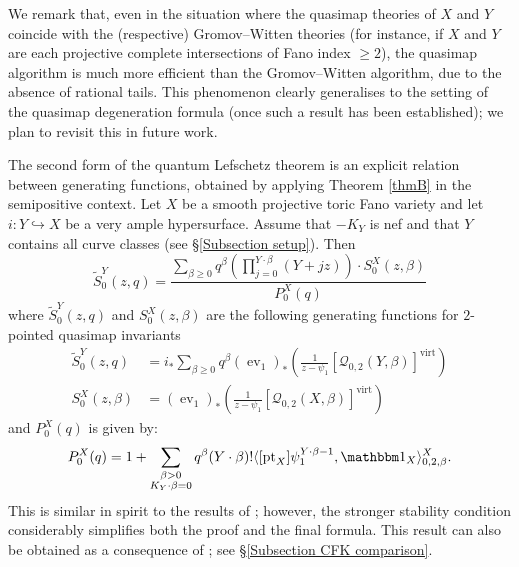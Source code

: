\documentclass[10pt]{amsart}
\newcommand{\Q}[4]{\mathcal{Q}_{#1,#2}(#3,#4)}
\newcommand{\virt}[1]{[#1]^{\operatorname{virt}}}
\newcommand{\pt}{\operatorname{pt}}
\newcommand{\ev}{\operatorname{ev}}
\theoremstyle{definition}
\newenvironment{customthm}[1]
  {\renewcommand\theinnercustomthm{#1}\innercustomthm}
  {\endinnercustomthm}
\theoremstyle{definition}
\begin{document}
We remark that, even in the situation where the quasimap theories of $X$ and $Y$ coincide with the (respective) Gromov--Witten theories (for instance, if $X$ and $Y$ are each projective complete intersections of Fano index $\geq 2$), the quasimap algorithm is much more efficient than the Gromov--Witten algorithm, due to the absence of rational tails. This phenomenon clearly generalises to the setting of the quasimap degeneration formula (once such a result has been established); we plan to revisit this in future work.

The second form of the quantum Lefschetz theorem is an explicit relation between generating functions, obtained by applying Theorem \ref{thmB} in the semipositive context.
\begin{customthm}{C}[\textbf{Theorem \ref{Theorem Quantum Lefschetz}}]\label{thmC}
Let $X$ be a smooth projective toric Fano variety and let $i\colon Y \hookrightarrow X$ be a very ample hypersurface. Assume that $-K_Y$ is nef and that $Y$ contains all curve classes (see \S \ref{Subsection setup}). Then
\begin{equation*}
\tilde{S}_0^Y(z,q) = \dfrac{\sum_{\beta\geq 0} q^\beta\left(\prod_{j=0}^{Y\cdot\beta}(Y+jz)\right)\cdot S_0^X(z,\beta)}{P_0^X(q)}
\end{equation*}
where $\tilde{S}_0^Y(z,q)$ and $S_0^X(z,\beta)$ are the following generating functions for $2$-pointed quasimap invariants
\begin{align*}
\tilde{S}_0^Y(z,q)&=i_* \sum_{\beta \geq 0} q^\beta (\ev_1)_*\left(\frac{1}{z-\psi_1} \virt{\Q{0}{2}{Y}{\beta}}\right)\\
S_0^X(z,\beta)&=(\ev_1)_*\left(\frac{1}{z-\psi_1} \virt{\Q{0}{2}{X}{\beta}}\right)
\end{align*}
and $P_0^X(q)$ is given by:
\begin{equation*}
P_0^X(q) = 1 + \sum_{\substack{\beta>0 \\ K_Y\cdot\beta=0}} q^\beta(Y\cdot\beta)!\langle [\pt_X] \psi_1^{Y\cdot\beta-1} ,\mathbbm 1_{X}\rangle_{0,2,\beta}^X.
\end{equation*}
\end{customthm}
\noindent This is similar in spirit to the results of \cite{Ga-MF}; however, the stronger stability condition considerably simplifies both the proof and the final formula. This result can also be obtained as a consequence of \cite[Corollary~5.5.1]{CF-K-wallcrossing}; see \S \ref{Subsection CFK comparison}. 
\end{document}
